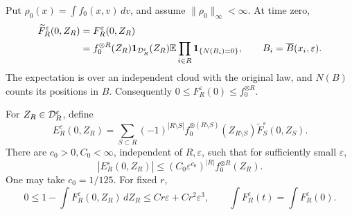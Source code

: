\begin{proposition}\label{pre:initial}
Put $\rho_0(x)=\int f_0(x,v)\,dv$, and assume $\|\rho_0\|_\infty<\infty$.
At time zero,
\begin{equation}\label{eq:pre-insertion}
 \begin{split}
 \widetilde F_R^\varepsilon(0,Z_R)
 &=F_R^\varepsilon(0,Z_R)\\
 &=f_0^{\otimes R}(Z_R)\mathbf1_{{\cal D}_R^\varepsilon}(Z_R)
       \mathbb E\prod_{i\in R}\mathbf1_{\{N(B_i)=0\}},
 \qquad B_i=\overline B(x_i,\varepsilon).
 \end{split}
\end{equation}
The expectation is over an independent cloud with the original law,
and $N(B)$ counts its positions in $B$.
Consequently $0\leq F_R^\varepsilon(0)\leq f_0^{\otimes R}$.

For $Z_R\in{\cal D}_R^\varepsilon$, define
\begin{equation}\label{eq:pre-initialcenter}
 E_R^\varepsilon(0,Z_R)=
 \sum_{S\subset R}(-1)^{|R\setminus S|}
      f_0^{\otimes(R\setminus S)}(Z_{R\setminus S})
      \widetilde F_S^\varepsilon(0,Z_S).
\end{equation}
There are $c_0>0,C_0<\infty$, independent of $R,\varepsilon$, such that
for sufficiently small $\varepsilon$,
\begin{equation}\label{eq:pre-centersmall}
 |E_R^\varepsilon(0,Z_R)|
       \leq(C_0\varepsilon^{c_0})^{|R|}f_0^{\otimes R}(Z_R).
\end{equation}
One may take $c_0=1/125$.
For fixed $r$,
\begin{equation}\label{eq:pre-mass}
 0\leq1-\int F_R^\varepsilon(0,Z_R)\,dZ_R
       \leq Cr\varepsilon+Cr^2\varepsilon^3,
 \qquad \int F_R^\varepsilon(t)=\int F_R^\varepsilon(0).
\end{equation}
\end{proposition}

